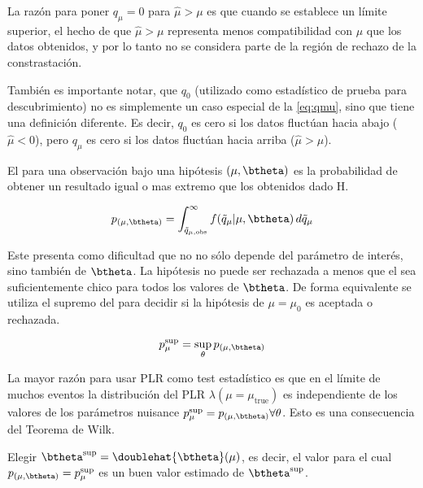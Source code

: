 La razón para poner $q_\mu = 0$ para $\hat{\mu} > \mu$ es que cuando se
establece un límite superior, el hecho de que $\hat{\mu} > \mu$ representa menos
compatibilidad con $\mu$ que los datos obtenidos, y por lo tanto no se considera
parte de la región de rechazo de la constrastación.

También es importante notar, que $q_0$ (utilizado como estadístico de prueba para
descubrimiento) no es simplemente un caso especial de la
\cref{eq:qmu}, sino que tiene una definición diferente. Es decir, $q_0$ es cero
si los datos fluctúan hacia abajo ($\hat{\mu}<0$), pero $q_\mu$ es cero si los
datos fluctúan hacia arriba ($\hat{\mu}>\mu$).


El {\pvalue} para una observación bajo una hipótesis $(\mu,\btheta)$ es la
probabilidad de obtener un resultado igual o mas extremo que los obtenidos dado
H.

\begin{equation}
  p_{(\mu,\btheta)} = \int_{\tilde{q}_{\mu,\text{obs}}}^{\infty}
  f(\tilde{q}_\mu|\mu,\btheta) \, d\tilde{q}_\mu
\end{equation}

Este {\pvalue} presenta como dificultad que no no sólo depende del parámetro de interés,
sino también de $\btheta$. La hipótesis no puede ser rechazada a menos que
el {\pvalue} sea suficientemente chico para todos los valores de $\btheta$. De forma
equivalente se utiliza el supremo del {\pvalue} para decidir si la hipótesis de $\mu = \mu_0$
es aceptada o rechazada.

\begin{equation}
  p_\mu^\text{sup} = \sup_\theta p_{(\mu,\btheta)}
\end{equation}

La mayor razón para usar PLR como test estadístico es que en el límite de muchos
eventos la distribución del PLR $\lambda(\mu=\mu_\text{true})$ es independiente
de los valores de los parámetros nuisance $p_\mu^\text{sup} = p_{(\mu,\btheta)}
\forall \theta$. Esto es una consecuencia del Teorema de Wilk.

Elegir $\btheta^\text{sup} = \doublehat{\btheta}(\mu)$, es decir, el valor para el
cual $p_{(\mu,\btheta)} = p_\mu^\text{sup}$ es un buen valor estimado de
$\btheta^\text{sup}$.

